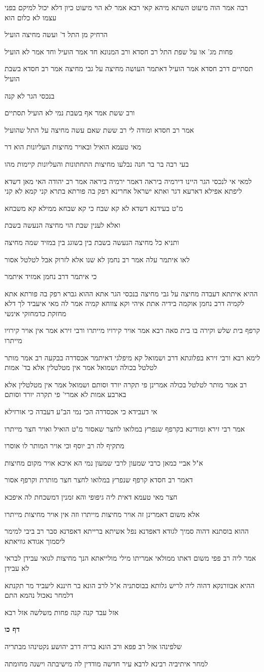\documentclass[12pt, openany]{book}
\newcommand{\sethebfont}{
\fontsize{10.5pt}{21.0pt} \selectfont
}
\newcommand{\textblock}[1]{
{\sethebfont #1\\}	
}
\newcommand{\sectname}{}
\newcommand{\newsection}[1]{
	\addcontentsline{toc}{section}{#1}
	\renewcommand{\sectname}{#1}	
	\vspace{-\baselineskip}
	\begin{center}
		\textbf{%
\fontsize{16pt}{16pt}\selectfont
			#1}
	\end{center}
	\vspace{-\baselineskip}
	\nopagebreak
}
\begin{document}
\textblock{רבה אמר הוה מיעוט השתא מיהא קאי רבא אמר לא הוי מיעוט כיון דלא יכול למיקם בפני עצמו לא כלום הוא}
\textblock{הרחיק מן התל ד' ועשה מחיצה הועיל}
\textblock{פחות מג' או על שפת התל רב חסדא ורב המנונא חד אמר הועיל וחד אמר לא הועיל}
\textblock{תסתיים דרב חסדא אמר הועיל דאתמר העושה מחיצה על גבי מחיצה אמר רב חסדא בשבת הועיל}
\textblock{בנכסי הגר לא קנה}
\textblock{ורב ששת אמר אף בשבת נמי לא הועיל תסתיים}
\textblock{אמר רב חסדא ומודה לי רב ששת שאם עשה מחיצה על התל שהועיל}
\textblock{מאי טעמא הואיל ובאויר מחיצות העליונות הוא דר}
\textblock{בעי רבה בר בר חנה נבלעו מחיצות התחתונות והעליונות קיימות מהו}
\textblock{למאי אי לנכסי הגר היינו דירמיה ביראה דאמר ירמיה ביראה אמר רב יהודה האי מאן דשדא ליפתא אפילא דארעא דגר ואתא ישראל אחרינא רפק בה פורתא בתרא קני קמא לא קני}
\textblock{מ"ט בעידנא דשדא לא קא שבח כי קא שבחא ממילא קא משבחא}
\textblock{ואלא לענין שבת הוי מחיצה הנעשה בשבת}
\textblock{ותניא כל מחיצה הנעשה בשבת בין בשוגג בין במזיד שמה מחיצה}
\textblock{לאו איתמר עלה אמר רב נחמן לא שנו אלא לזרוק אבל לטלטל אסור}
\textblock{כי איתמר דרב נחמן אמזיד איתמר}
\textblock{ההיא איתתא דעבדה מחיצה על גבי מחיצה בנכסי הגר אתא ההוא גברא רפק בה פורתא אתא לקמיה דרב נחמן אוקמה בידיה אתת איהי וקא צווחא קמיה אמר לה מאי איעביד לך דלא מחזקת כדמחזקי אינשי}
\textblock{קרפף בית שלש וקירה בו בית סאה רבא אמר אויר קירויו מייתרו ורבי זירא אמר אין אויר קירויו מייתרו}
\textblock{לימא רבא ורבי זירא בפלוגתא דרב ושמואל קא מיפלגי דאיתמר אכסדרה בבקעה רב אמר מותר לטלטל בכולה ושמואל אמר אין מטלטלין אלא בד' אמות}
\textblock{רב אמר מותר לטלטל בכולה אמרינן פי תקרה יורד וסותם ושמואל אמר אין מטלטלין אלא בארבע אמות לא אמרי' פי תקרה יורד וסותם}
\textblock{אי דעבידא כי אכסדרה הכי נמי הב"ע דעבדה כי אורזילא}
\textblock{אמר רבי זירא ומודינא בקרפף שנפרץ במלואו לחצר שאסור מ"ט הואיל ואויר חצר מייתרו}
\textblock{מתקיף לה רב יוסף וכי אויר המותר לו אוסרו}
\textblock{א"ל אביי כמאן כרבי שמעון לרבי שמעון נמי הא איכא אויר מקום מחיצות}
\textblock{דאמר רב חסדא קרפף שנפרץ במלואו לחצר חצר מותרת וקרפף אסור}
\textblock{חצר מאי טעמא דאית ליה גיפופי והא זמנין דמשכחת לה איפכא}
\textblock{אלא משום דאמרינן זה אויר מחיצות מייתרו וזה אין אויר מחיצות מייתרו}
\textblock{ההוא בוסתנא דהוה סמיך לגודא דאפדנא נפל אשיתא ברייתא דאפדנא סבר רב ביבי למימר ליסמוך אגודא גוויאתא}
\textblock{אמר ליה רב פפי משום דאתו ממולאי אמריתו מילי מולייאתא הנך מחיצות לגואי עבידן לבראי לא עבידן}
\textblock{ההיא אבוורנקא דהוה ליה לריש גלותא בבוסתניה א"ל לרב הונא בר חיננא ליעביד מר תקנתא דלמחר נאכול נהמא התם}
\textblock{אזל עבד קנה קנה פחות משלשה אזל רבא}
\newsection{דף כו}
\textblock{שלפינהו אזל רב פפא ורב הונא בריה דרב יהושע נקטינהו מבתריה}
\textblock{למחר איתיביה רבינא לרבא עיר חדשה מודדין לה מישיבתה וישנה מחומתה}
\end{document}
